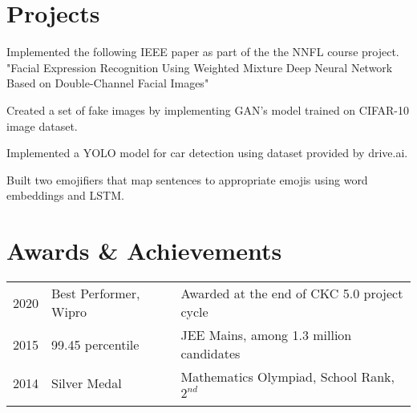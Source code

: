 \documentclass[]{plushcv}
\begin{document}
\begin{minipage}[t]{0.70\textwidth}
\section{Projects}

\begin{tightemize}
\item Implemented the following IEEE paper as part of the the NNFL course project. "Facial Expression Recognition Using Weighted Mixture Deep Neural Network Based on Double-Channel Facial Images"
\end{tightemize}
\sectionsep

\begin{tightemize}
\item Created a set of fake images by implementing GAN's model trained on CIFAR-10 image dataset.
\end{tightemize}
\sectionsep

\begin{tightemize}
\item Implemented a YOLO model for car detection using dataset provided by drive.ai.
\end{tightemize}
\sectionsep

\begin{tightemize}
\item Built two emojifiers that map sentences to appropriate emojis using word embeddings and LSTM.
\end{tightemize}
\sectionsep


 \section{Awards \& Achievements} 
 \begin{tabular}{rll}
  2020	     & Best Performer, Wipro & Awarded at the end of CKC 5.0 project cycle\\
 2015	     & 99.45 percentile  & JEE Mains, among 1.3 million candidates\\
 2014	     & Silver Medal  & Mathematics Olympiad, School Rank, $2^{nd}$ \\
 \\
 \end{tabular}
 \sectionsep
%
%

\end{minipage} 
\end{document}
